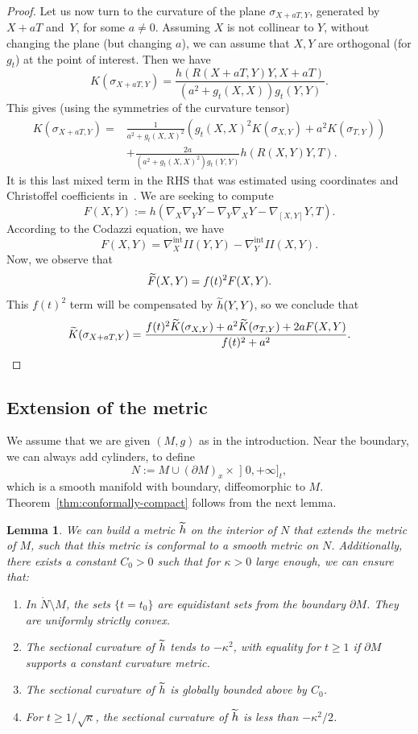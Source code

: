 \documentclass[10pt]{amsart}
\newtheorem{lemm}[theo]{Lemma}\newtheorem{prop}[theo]{Proposition}\newtheorem{coro}[theo]{Corollary}\newtheorem{conj}[theo]{Conjecture}
\theoremstyle{definition}\newtheorem{defi}[theo]{Definition}\newtheorem{rema}[theo]{Remark}\newtheorem{exam}[theo]{Example}\newtheorem{exem}[theo]{Example}\newtheorem{nota}[theo]{Notation}
\DeclareMathOperator{\intt}{int}
\theoremstyle{plain}
\newcommand*{\relabel}{\renewcommand{\labelenumi}{(\theenumi)}}
\newcommand*{\romanenumi}{\renewcommand*{\theenumi}{\roman{enumi}}\relabel}
\let\oldtilde\tilde
\renewcommand*{\tilde}[1]{\mathchoice{\widetilde{#1}}{\widetilde{#1}}{\oldtilde{#1}}{\oldtilde{#1}}}
\begin{document}
\begin{proof}
Let us now turn to the curvature of the plane $\sigma_{X+aT,Y}$, generated by $X + aT$ and~$Y$, for some $a\neq 0$. Assuming $X$ is not collinear to $Y$, without changing the plane (but changing $a$), we can assume that $X,Y$ are orthogonal (for $g_t$) at the point of interest. Then we have
\[
K(\sigma_{X+aT, Y}) = \frac{ h(R(X+aT, Y)Y, X+aT)}{(a^2+g_t(X,X))g_t(Y,Y)}.
\]
This gives (using the symmetries of the curvature tensor)
\[
\begin{split}
K(\sigma_{X+aT, Y}) =& \frac{1}{a^2+g_t(X,X)^2}\left(g_t(X,X)^2 K(\sigma_{X,Y}) + a^2 K(\sigma_{T,Y})\right) \\
& + \frac{2a}{(a^2+g_t(X,X)^2)g_t(Y,Y)}h(R(X,Y)Y,T).
\end{split}
\]
It is this last mixed term in the RHS that was estimated using coordinates and Christoffel coefficients in~\cite{Chen-Erchenko-Gogolev}. We are seeking to compute
\[
F(X,Y):= h\left(\nabla_X \nabla_Y Y - \nabla_Y \nabla_X Y - \nabla_{[X,Y]} Y, T\right).
\]
According to the Codazzi equation, we have
\[
F(X,Y)=\nabla_X^{\intt} II(Y,Y) - \nabla_Y^{\intt} II(X,Y).
\]
Now, we observe that
\[
\tilde{F}(X,Y)= f(t)^2 F(X,Y).
\]
This $f(t)^2$ term will be compensated by $\tilde{h}(Y,Y)$, so we conclude that
\[
\tilde{K}(\sigma_{X+aT,Y}) = \frac{ f(t)^2 \tilde{K}(\sigma_{X,Y}) + a^2 \tilde{K}(\sigma_{T,Y}) + 2 a F(X,Y) }{f(t)^2 + a^2}.\qedhere
\]
\end{proof}

\subsection{Extension of the metric}

We assume that we are given $(M,g)$ as in the introduction. Near the boundary, we can always add cylinders, to define
\[
N:= M \cup (\partial M)_x\times\mathopen{]}0, +\infty]_t,
\]
which is a smooth manifold with boundary, diffeomorphic to $M$. Theorem~\ref{thm:conformally-compact} follows from the next lemma.

\begin{lemm}\label{lemma:extension}
We can build a metric $\tilde{h}$ on the interior of $N$ that extends the metric of $M$, such that this metric is conformal to a smooth metric on $N$. Additionally, there exists a constant $C_0>0$ such that for $\kappa>0$ large enough, we can ensure that:
\begin{enumerate}\romanenumi
\item\label{lemm2.2.1} In $\mathring{N}\setminus M$, the sets $\{t=t_0\}$ are equidistant sets from the boundary $\partial M$. They are uniformly strictly convex.
\item\label{lemm2.2.2} The sectional curvature of $\tilde{h}$ tends to $-\kappa^2$, with equality for $t\geq 1$ if $\partial M$ supports a constant curvature metric.
\item\label{lemm2.2.3} The sectional curvature of $\tilde{h}$ is globally bounded above by $C_0$.
\item\label{lemm2.2.4} For $t\geq 1/\sqrt{\kappa}$, the sectional curvature of $\tilde{h}$ is less than $-\kappa^2/2$.
\end{enumerate}
\end{lemm}
\end{document}
